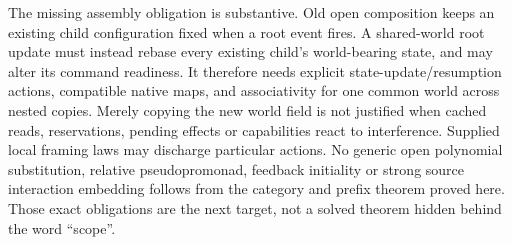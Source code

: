 \documentclass[11pt]{article}
\begin{document}
The missing assembly obligation is substantive. Old open composition keeps an existing child configuration fixed when a root event fires. A shared-world root update must instead rebase every existing child's world-bearing state, and may alter its command readiness. It therefore needs explicit state-update/resumption actions, compatible native maps, and associativity for one common world across nested copies. Merely copying the new world field is not justified when cached reads, reservations, pending effects or capabilities react to interference. Supplied local framing laws may discharge particular actions. No generic open polynomial substitution, relative pseudopromonad, feedback initiality or strong source interaction embedding follows from the category and prefix theorem proved here. Those exact obligations are the next target, not a solved theorem hidden behind the word ``scope''.
\end{document}
